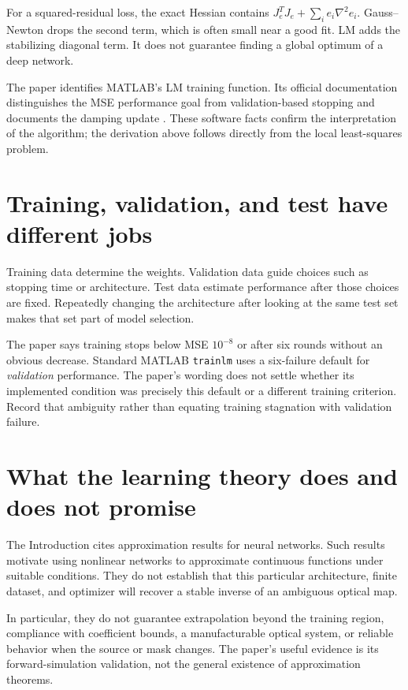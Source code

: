 For a squared-residual loss, the exact Hessian contains
$J_e^TJ_e+\sum_i e_i\nabla^2e_i$.
Gauss--Newton drops the second term, which is often small near a
good fit. LM adds the stabilizing diagonal term.
It does not guarantee finding a global optimum of a deep network.

The paper identifies MATLAB's LM training function. Its official
documentation distinguishes the MSE performance goal from
validation-based stopping and documents the damping update
\cite{trainlm}. These software facts confirm the interpretation of the
algorithm; the derivation above follows directly from the local
least-squares problem.

\section{Training, validation, and test have different jobs}
Training data determine the weights. Validation data guide choices such
as stopping time or architecture. Test data estimate performance after
those choices are fixed. Repeatedly changing the architecture after
looking at the same test set makes that set part of model selection.

The paper says training stops below MSE $10^{-8}$ or after six rounds
without an obvious decrease. Standard MATLAB \texttt{trainlm} uses a
six-failure default for \emph{validation} performance.
The paper's wording does not settle whether its implemented condition
was precisely this default or a different training criterion.
Record that ambiguity rather than equating training stagnation with
validation failure.

\section{What the learning theory does and does not promise}
The Introduction cites approximation results for neural networks.
Such results motivate using nonlinear networks to approximate continuous
functions under suitable conditions. They do not establish that this
particular architecture, finite dataset, and optimizer will recover a
stable inverse of an ambiguous optical map.

In particular, they do not guarantee extrapolation beyond the training
region, compliance with coefficient bounds, a manufacturable optical
system, or reliable behavior when the source or mask changes.
The paper's useful evidence is its forward-simulation validation,
not the general existence of approximation theorems.

